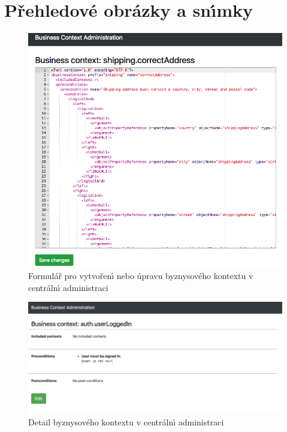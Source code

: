 
\chapter{Přehledové obrázky a sn\'{\i}mky}

\begin{figure}
    \centering
    \includegraphics[width=0.9\linewidth]{figures/business-context-edit.png}
    \caption{Formulář pro vytvořen\'{\i} nebo úpravu byznysového kontextu v centráln\'{\i} administraci}
    \label{fig:screenshot-context-edit}
\end{figure}

\begin{figure}
    \centering
    \includegraphics[width=0.9\linewidth]{figures/business-context-detail.png}
    \caption{Detail byznysového kontextu v centráln\'{\i} administraci}
    \label{fig:screenshot-context-detail}
\end{figure}

